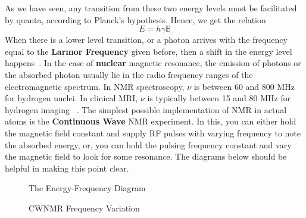 \documentclass[12pt]{article}
\begin{document}
As we have seen, any transition from these two energy levels must be facilitated by quanta, according to Planck's hypothesis. Hence, we get the relation
$$E = h\gamma\mathbb{B}$$
When there is a lower level transition, or a photon arrives with the frequency equal to the \textbf{Larmor Frequency} given before, then a shift in the energy level happens~\cite{acadml}. In the case of \textbf{nuclear} magnetic resonance, the emission of photons or the absorbed photon usually lie in the radio frequency ranges of the electromagnetic spectrum. In NMR spectroscopy, $\nu$ is between 60 and 800 MHz for hydrogen nuclei. In clinical MRI, $\nu$ is typically between 15 and 80 MHz for hydrogen imaging ~\cite{jph}. The simplest possible implementation of NMR in actual atoms is the \textbf{Continuous Wave} NMR experiment. In this, you can either hold the magnetic field constant and supply RF pulses with varying frequency to note the absorbed energy, or, you can hold the pulsing frequency constant and vary the magnetic field to look for some resonance. The diagrams below should be helpful in making this point clear.

\begin{figure}
\caption{The Energy-Frequency Diagram}
\end{figure}
\begin{figure}
\caption{CWNMR Frequency Variation}
\end{figure}
\end{document}
